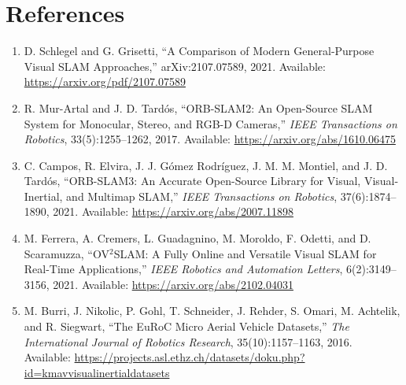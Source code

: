\documentclass[11pt]{article}
\begin{document}
\section{References}

\begin{enumerate}
    \item D. Schlegel and G. Grisetti, ``A Comparison of Modern General-Purpose Visual SLAM Approaches,'' arXiv:2107.07589, 2021. Available: \url{https://arxiv.org/pdf/2107.07589}
    \item R. Mur-Artal and J. D. Tard\'os, ``ORB-SLAM2: An Open-Source SLAM System for Monocular, Stereo, and RGB-D Cameras,'' \textit{IEEE Transactions on Robotics}, 33(5):1255--1262, 2017. Available: \url{https://arxiv.org/abs/1610.06475}
    \item C. Campos, R. Elvira, J. J. G\'omez Rodr\'iguez, J. M. M. Montiel, and J. D. Tard\'os, ``ORB-SLAM3: An Accurate Open-Source Library for Visual, Visual-Inertial, and Multimap SLAM,'' \textit{IEEE Transactions on Robotics}, 37(6):1874--1890, 2021. Available: \url{https://arxiv.org/abs/2007.11898}
    \item M. Ferrera, A. Cremers, L. Guadagnino, M. Moroldo, F. Odetti, and D. Scaramuzza, ``OV$^{2}$SLAM: A Fully Online and Versatile Visual SLAM for Real-Time Applications,'' \textit{IEEE Robotics and Automation Letters}, 6(2):3149--3156, 2021. Available: \url{https://arxiv.org/abs/2102.04031}
    \item M. Burri, J. Nikolic, P. Gohl, T. Schneider, J. Rehder, S. Omari, M. Achtelik, and R. Siegwart, ``The EuRoC Micro Aerial Vehicle Datasets,'' \textit{The International Journal of Robotics Research}, 35(10):1157--1163, 2016. Available: \url{https://projects.asl.ethz.ch/datasets/doku.php?id=kmavvisualinertialdatasets}
\end{enumerate}
\end{document}
